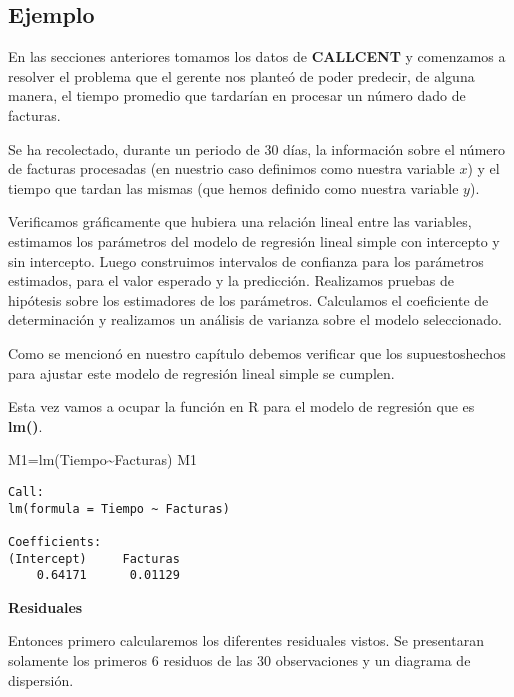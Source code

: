 \documentclass[
  a4paper,
  oneside,
  openany]{book}
\newenvironment{Shaded}{\begin{snugshade}}{\end{snugshade}}
\newcommand{\FunctionTok}[1]{\textcolor[rgb]{0.00,0.00,0.00}{#1}}
\newcommand{\NormalTok}[1]{#1}
\newcommand{\OtherTok}[1]{\textcolor[rgb]{0.56,0.35,0.01}{#1}}
\newcommand{\SpecialCharTok}[1]{\textcolor[rgb]{0.00,0.00,0.00}{#1}}
\begin{document}
\hypertarget{ejemplo-19}{%
\subsection{Ejemplo}\label{ejemplo-19}}

En las secciones anteriores tomamos los datos de \textbf{CALLCENT} y comenzamos a resolver el problema que el gerente nos planteó de poder
predecir, de alguna manera, el tiempo promedio que tardarían en procesar un número dado de facturas.

Se ha recolectado, durante un periodo de 30 días, la información sobre el número de facturas procesadas (en nuestrio caso definimos como nuestra variable \(x\)) y el tiempo que tardan las mismas (que hemos definido como nuestra variable \(y\)).

Verificamos gráficamente que hubiera una relación lineal entre las variables, estimamos los parámetros del modelo de regresión lineal simple con intercepto y sin intercepto. Luego construimos intervalos de confianza para los parámetros estimados, para el valor esperado y la predicción. Realizamos pruebas de hipótesis sobre los estimadores de los parámetros. Calculamos el coeficiente de determinación y realizamos un análisis de varianza sobre el modelo seleccionado.

Como se mencionó en nuestro capítulo debemos verificar que los supuestoshechos para ajustar este modelo de regresión lineal simple se cumplen.

Esta vez vamos a ocupar la función en R para el modelo de regresión que es \textbf{lm()}.

\begin{Shaded}
\begin{Highlighting}[]
\NormalTok{M1}\OtherTok{=}\FunctionTok{lm}\NormalTok{(Tiempo}\SpecialCharTok{\textasciitilde{}}\NormalTok{Facturas)}
\NormalTok{M1}
\end{Highlighting}
\end{Shaded}

\begin{verbatim}
Call:
lm(formula = Tiempo ~ Facturas)

Coefficients:
(Intercept)     Facturas  
    0.64171      0.01129  
\end{verbatim}

\textbf{Residuales}

Entonces primero calcularemos los diferentes residuales vistos. Se presentaran solamente los primeros 6 residuos de las 30 observaciones y un diagrama de dispersión.
\end{document}

